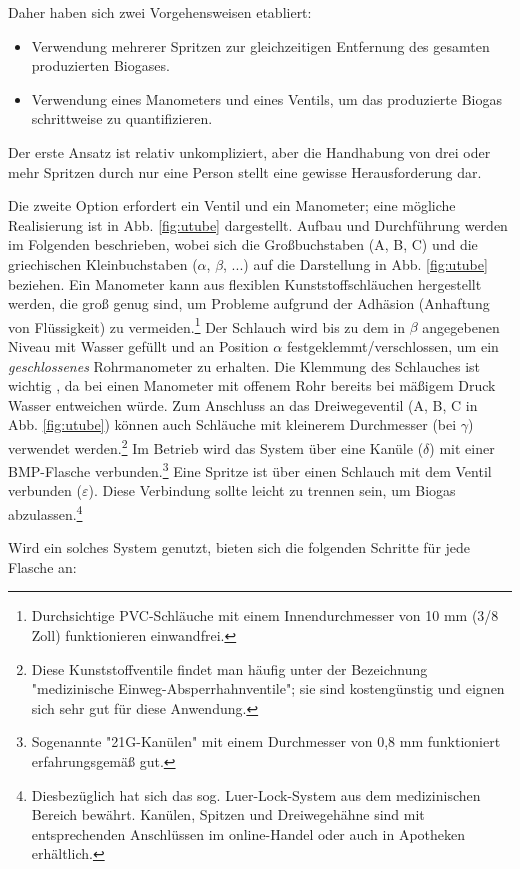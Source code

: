 \documentclass[]{article}
\begin{document}
Daher haben sich zwei Vorgehensweisen etabliert:
\begin{itemize}
  \item Verwendung mehrerer Spritzen zur gleichzeitigen Entfernung des gesamten produzierten Biogases.
  \item Verwendung eines Manometers und eines Ventils, um das produzierte Biogas schrittweise zu quantifizieren.
\end{itemize}

Der erste Ansatz ist relativ unkompliziert, aber die Handhabung von drei oder mehr Spritzen durch nur eine Person stellt eine gewisse Herausforderung dar.


Die zweite Option erfordert ein Ventil und ein Manometer; eine mögliche Realisierung ist in Abb. \ref{fig:utube} dargestellt.
Aufbau und Durchführung werden im Folgenden beschrieben, wobei sich die Großbuchstaben (A, B, C) und die griechischen Kleinbuchstaben ($\alpha$, $\beta$, ...) auf die Darstellung in Abb. \ref{fig:utube} beziehen.
Ein Manometer kann aus flexiblen Kunststoffschläuchen hergestellt werden, die groß genug sind, um Probleme aufgrund der Adhäsion (Anhaftung von Flüssigkeit) zu vermeiden.\footnote{Durchsichtige  PVC-Schläuche mit einem Innendurchmesser von 10 mm (3/8 Zoll) funktionieren einwandfrei.}
Der Schlauch wird bis zu dem in $\beta$ angegebenen Niveau mit Wasser gefüllt und an Position $\alpha$ festgeklemmt/verschlossen, um ein \textit{geschlossenes} Rohrmanometer zu erhalten.
Die Klemmung des Schlauches ist wichtig , da bei einen Manometer mit offenem Rohr bereits bei mäßigem Druck Wasser entweichen würde.
Zum Anschluss an das Dreiwegeventil (A, B, C in Abb. \ref{fig:utube}) können auch Schläuche mit kleinerem Durchmesser (bei $\gamma$) verwendet werden.\footnote{Diese Kunststoffventile findet man häufig unter der Bezeichnung "medizinische Einweg-Absperrhahnventile"; sie sind kostengünstig und eignen sich sehr gut für diese Anwendung.}
Im Betrieb wird das System über eine Kanüle ($\delta$) mit einer BMP-Flasche verbunden.\footnote{Sogenannte "21G-Kanülen" mit einem Durchmesser von 0,8 mm funktioniert erfahrungsgemäß gut.}
Eine Spritze ist über einen Schlauch mit dem Ventil verbunden ($\varepsilon$).
Diese Verbindung sollte leicht zu trennen sein, um Biogas abzulassen.\footnote{Diesbezüglich hat sich das sog. Luer-Lock-System aus dem medizinischen Bereich bewährt. Kanülen, Spitzen und Dreiwegehähne sind mit entsprechenden Anschlüssen im online-Handel oder auch in Apotheken erhältlich.}


Wird ein solches System genutzt, bieten sich die folgenden Schritte für jede Flasche an:
\end{document}
